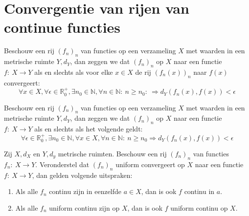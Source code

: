 \documentclass[main.tex]{subfiles}
\begin{document}
\section{Convergentie van rijen van continue functies}
\label{sec:conv-van-rijen}

\begin{de}
  \label{de:metrische-ruimten-puntsgewijze-convergentie-van-rij-functies}
  Beschouw een rij $(f_{n})_{n}$ van functies op een verzameling $X$ met waarden in een metrische ruimte $Y,d_{Y}$, dan zeggen we dat $(f_{n})_{n}$  op $X$ naar een functie $f:\ X \rightarrow Y$ als en slechts als voor elke $x\in X$ de rij $(f_{n}(x))_{n}$ naar $f(x)$ convergeert:
  \[ \forall x\in X, \forall \epsilon \in \mathbb{R}_{0}^{+}, \exists n_{0} \in \mathbb{N}, \forall n\in \mathbb{N}:\ n \ge n_{0}:\ \Rightarrow d_{Y}(f_{n}(x),f(x)) < \epsilon \]
\end{de}

\begin{de}
  Beschouw een rij $(f_{n})_{n}$ van functies op een verzameling $X$ met waarden in een metrische ruimte $Y,d_{Y}$, dan zeggen we dat $(f_{n})_{n}$  op $X$ naar een functie $f:\ X \rightarrow Y$ als en slechts als het volgende geldt:
  \[ \forall \epsilon \in \mathbb{R}_{0}^{+}, \exists n_{0}\in \mathbb{N}, \forall x\in X, \forall n\in \mathbb{N}:\ n \ge n_{0} \Rightarrow d_{Y}(f_{n}(x),f(x)) < \epsilon \]
\end{de}

\begin{bst}
  Zij $X,d_{X}$ en $Y,d_{y}$ metrische ruimten.
  Beschouw een rij $(f_{n})_{n}$ van functies $f_{n}:\ X \rightarrow Y$.
  Veronderstel dat $(f_{n})_{n}$ uniform convergeert op $X$ naar een functie $f:\ X \rightarrow Y$, dan gelden volgende uitspraken:
  \begin{enumerate}
  \item Als alle $f_{n}$ continu zijn in eenzelfde $a\in X$, dan is ook $f$ continu in $a$.
  \item Als alle $f_{n}$ uniform continu zijn op $X$, dan is ook $f$ uniform continu op $X$.
  \end{enumerate}
\end{bst}
\end{document}
